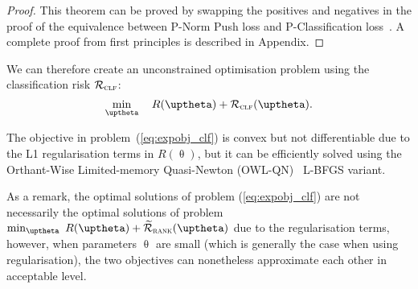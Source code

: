 \begin{proof}
This theorem can be proved by swapping the positives and negatives in the proof of 
the equivalence between P-Norm Push loss and P-Classification loss~\cite{ertekin2011equivalence}.
A complete proof from first principles is described in Appendix.
\end{proof}

We can therefore create an unconstrained optimisation problem using the classification risk $\mathcal{R}_\textsc{clf}$:
\begin{equation}
\label{eq:expobj_clf}
\min_\uptheta \quad R(\uptheta) + \RCal_\textsc{clf}(\uptheta).
\end{equation}

The objective in problem~(\ref{eq:expobj_clf}) is convex but not differentiable due to the L1 regularisation terms in $R(\uptheta)$,
but it can be efficiently solved using the Orthant-Wise Limited-memory Quasi-Newton (OWL-QN)~\cite{andrew2007scalable} L-BFGS variant.

As a remark, the optimal solutions of problem (\ref{eq:expobj_clf}) are not necessarily the optimal solutions 
of problem $\min_\uptheta \ R(\uptheta) + \widetilde\RCal_\textsc{rank}(\uptheta)$ due to the regularisation terms,
however, when parameters $\uptheta$ are small (which is generally the case when using regularisation), the two objectives 
can nonetheless approximate each other in acceptable level.





%


